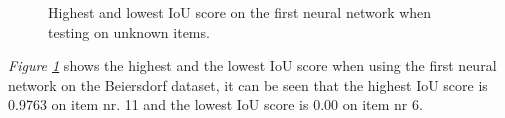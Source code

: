 \begin{figure}[h]
 \centering
 \hfill
 
 \caption{Highest and lowest IoU score on the first neural network when testing on unknown items.}
 \label{fig:v1unknowniou}
\end{figure}
\textit{Figure \ref{fig:v1unknowniou}} shows the highest and the lowest IoU score when using the first neural network on the Beiersdorf dataset, it can be seen that the highest IoU score is 0.9763 on item nr. 11 and the lowest IoU score is 0.00 on item nr 6.

